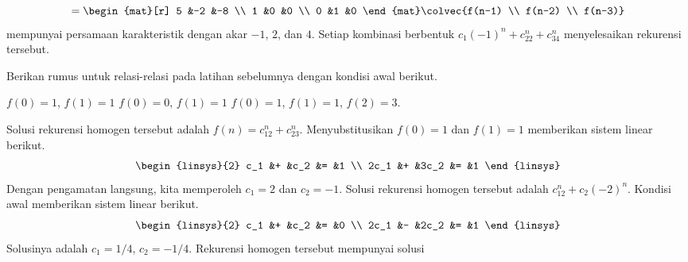 \begin{exercises}
\begin{answer}
\begin{exparts}
\begin{equation*}
          =
          \begin{mat}[r]
            5  &-2  &-8  \\
            1  &0  &0  \\
            0  &1  &0
          \end{mat}
          \colvec{f(n-1) \\ f(n-2) \\ f(n-3)}
        \end{equation*}
        mempunyai persamaan karakteristik dengan akar $-1$, $2$, dan $4$.
        Setiap kombinasi berbentuk
        $c_1(-1)^n+c_22^n+c_34^n$ menyelesaikan rekurensi tersebut.
    \end{exparts} 
   \end{answer}
  \item \label{exer:SolvePartRecurSoltn} 
    Berikan rumus untuk relasi-relasi pada latihan sebelumnya dengan kondisi
    awal berikut.
    \begin{exparts}
      \partsitem $f(0)=1$, $f(1)=1$
      \partsitem $f(0)=0$, $f(1)=1$
      \partsitem $f(0)=1$, $f(1)=1$, $f(2)=3$.      
    \end{exparts}
    \begin{answer}
      \begin{exparts}
        \partsitem Solusi rekurensi homogen tersebut adalah
          $f(n)=c_12^n+c_23^n$.
          Menyubstitusikan $f(0)=1$ dan $f(1)=1$ memberikan sistem linear
          berikut.
          \begin{equation*}
            \begin{linsys}{2}
              c_1 &+ &c_2   &= &1 \\
             2c_1 &+ &3c_2  &= &1
            \end{linsys}
          \end{equation*}
          Dengan pengamatan langsung, kita memperoleh $c_1=2$ dan $c_2=-1$.
        \partsitem
          Solusi rekurensi homogen tersebut adalah
          $c_12^n+c_2(-2)^n$.
          Kondisi awal memberikan sistem linear berikut.
          \begin{equation*}
            \begin{linsys}{2}
              c_1 &+ &c_2  &= &0  \\
             2c_1 &- &2c_2 &= &1
            \end{linsys}
          \end{equation*}
          Solusinya adalah $c_1=1/4$, $c_2=-1/4$.
        \partsitem
          Rekurensi homogen tersebut mempunyai solusi

\end{exparts}
\end{answer}
\end{exercises}
